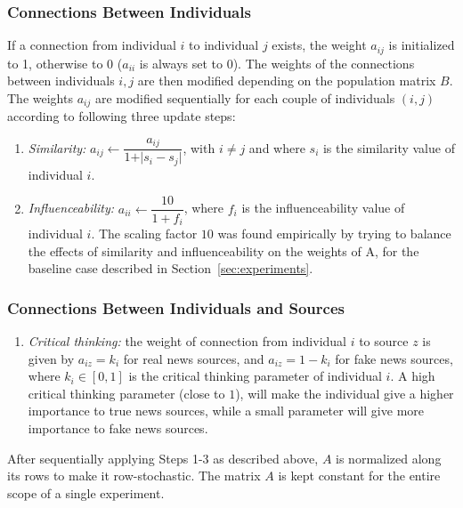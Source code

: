 \subsubsection{Connections Between Individuals}
\label{sec:conn_ind}
If a connection from individual $i$ to individual $j$ exists, the weight $a_{ij}$ is initialized to 1, otherwise to 0 ($a_{ii}$ is always set to 0).
The weights of the connections between individuals $i,j$ are then modified depending on the population matrix $B$. The weights $a_{ij}$ are modified sequentially for each couple of individuals $(i,j)$ according to following three update steps:

\begin{enumerate}
\item[\text{(S1)}] \textit{Similarity:} $a_{ij} \leftarrow \dfrac{a_{ij}}{1 + \vert s_i - s_j\vert}$, with $ i \neq j$ and where $s_i$ is the similarity value of individual $i$. 
\item[\text{(S2)}] \textit{Influenceability:} $a_{ii} \leftarrow \dfrac{10}{1 + f_i}$, where $f_i$ is the influenceability value of individual $i$. The scaling factor $10$ was found empirically by trying to balance the effects of similarity and influenceability on the weights of A, for the baseline case described in Section~\ref{sec:experiments}.
\end{enumerate}


\subsubsection{Connections Between Individuals and Sources}
\label{subsub:ind_sources}
\begin{enumerate}
\item[\text{(S3)}] \textit{Critical thinking:} the weight of connection from individual $i$ to source $z$ is given by $a_{iz} = k_i$ for real news sources, and $a_{iz} = 1 - k_i$ for fake news sources, where $k_i \in [0,1]$ is the critical thinking parameter of individual $i$. A high critical thinking parameter (close to $1$), will make the individual give a higher importance to true news sources, while a small parameter will give more importance to fake news sources.
\end{enumerate}
After sequentially applying Steps 1-3 as described above, $A$ is normalized along its rows to make it row-stochastic. The matrix $A$ is kept constant for the entire scope of a single experiment.